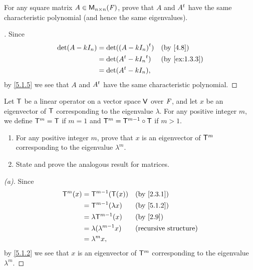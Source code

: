 \begin{ex}\label{ex:5.1.14}
  For any square matrix \(A \in \ms[n][n][\F]\), prove that \(A\) and \({A}^{t}\) have the same characteristic polynomial (and hence the same eigenvalues).
\end{ex}

\begin{proof}[]
  Since
  \begin{align*}
    \det(A - k I_n) & = \det(\tp{(A - k I_n)})    &  & \by{4.8}      \\
                    & = \det(\tp{A} - k \tp{I_n}) &  & \by{ex:1.3.3} \\
                    & = \det(\tp{A} - k I_n),
  \end{align*}
  by \cref{5.1.5} we see that \(A\) and \({A}^{t}\) have the same characteristic polynomial.
\end{proof}

\begin{ex}\label{ex:5.1.15}
  Let \(\mathsf{T}\) be a linear operator on a vector space \(\mathsf{V}\) over \(\mathit{F}\), and let \(x\) be an eigenvector of \(\mathsf{T}\) corresponding to the eigenvalue \(\lambda\).
  For any positive integer \(m\), we define \(\mathsf{T}^m = \mathsf{T}\) if \(m = 1\) and \(\mathsf{T}^m = \mathsf{T}^{m - 1} \circ \mathsf{T}\) if \(m > 1\).
  \begin{enumerate}
    \item For any positive integer \(m\), prove that \(x\) is an eigenvector of \(\mathsf{T}^m\) corresponding to the eigenvalue \(\lambda^m\).
    \item State and prove the analogous result for matrices.
  \end{enumerate}
\end{ex}

\begin{proof}[(a)]
  Since
  \begin{align*}
    \T^m(x) & = \T^{m - 1}(\T(x))           &  & \by{2.3.1}                   \\
            & = \T^{m - 1}(\lambda x)       &  & \by{5.1.2}                   \\
            & = \lambda \T^{m - 1}(x)       &  & \by{2.9}                     \\
            & = \lambda (\lambda^{m - 1} x) &  & \text{(recursive structure)} \\
            & = \lambda^m x,
  \end{align*}
  by \cref{5.1.2} we see that \(x\) is an eigenvector of \(\mathsf{T}^m\) corresponding to the eigenvalue \(\lambda^m\).
\end{proof}

